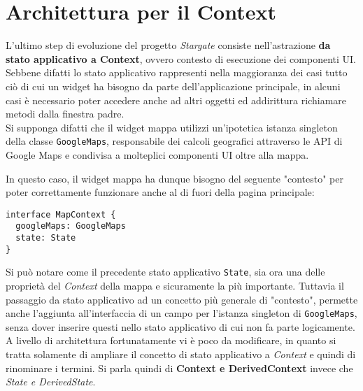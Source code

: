 
\chapter{Architettura per il Context}
\label{cap:architettura-context}

L'ultimo step di evoluzione del progetto \textit{Stargate} consiste nell'astrazione \textbf{da stato applicativo a Context}, ovvero contesto di esecuzione dei componenti UI. Sebbene difatti lo stato applicativo rappresenti nella maggioranza dei casi tutto ciò di cui un widget ha bisogno da parte dell'applicazione principale, in alcuni casi è necessario poter accedere anche ad altri oggetti ed addirittura richiamare metodi dalla finestra padre. \\

Si supponga difatti che il widget mappa utilizzi un'ipotetica istanza \gls{singleton} della classe \texttt{GoogleMaps}, responsabile dei calcoli geografici attraverso le API di Google Maps e condivisa a molteplici componenti UI oltre alla mappa.

In questo caso, il widget mappa ha dunque bisogno del seguente "contesto" per poter correttamente funzionare anche al di fuori della pagina principale: \\

\begin{lstlisting}[language={[Sharp]C}]
interface MapContext {
  googleMaps: GoogleMaps
  state: State
}
\end{lstlisting}

Si può notare come il precedente stato applicativo \texttt{State}, sia ora una delle proprietà del \textit{Context} della mappa e sicuramente la più importante. Tuttavia il passaggio da stato applicativo ad un concetto più generale di "contesto", permette anche l'aggiunta all'interfaccia di un campo per l'istanza singleton di \texttt{GoogleMaps}, senza dover inserire questi nello stato applicativo di cui non fa parte logicamente. \\

A livello di architettura fortunatamente vi è poco da modificare, in quanto si tratta solamente di ampliare il concetto di stato applicativo a \textit{Context} e quindi di rinominare i termini. Si parla quindi di \textbf{Context e DerivedContext} invece che \textit{State e DerivedState}.

